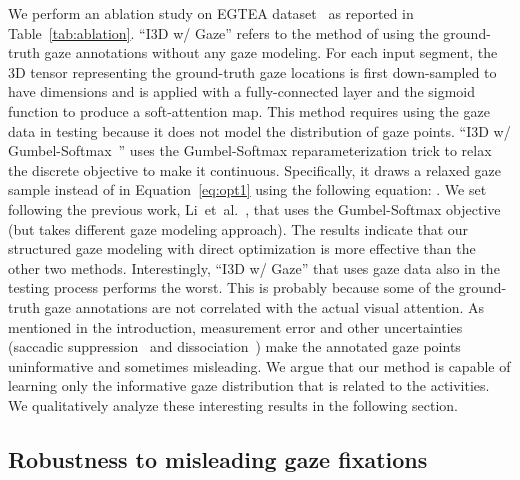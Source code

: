 \documentclass[10pt,twocolumn,letterpaper]{article}
\begin{document}
\label{subsec:ablation}
We perform an ablation study on EGTEA dataset~\cite{li2018eye} as reported in Table~\ref{tab:ablation}. ``I3D w/ Gaze'' refers to the method of using the ground-truth gaze annotations without any gaze modeling. For each input segment, the 3D tensor representing the ground-truth gaze locations  is first down-sampled to have  dimensions and is applied with a fully-connected layer and the sigmoid function to produce a soft-attention map. This method requires using the gaze data in testing because it does not model the distribution of gaze points. ``I3D w/ Gumbel-Softmax~\cite{jang2016categorical,maddison2016concrete}'' uses the Gumbel-Softmax reparameterization trick to relax the discrete objective to make it continuous. Specifically, it draws a relaxed gaze sample  instead of  in Equation~\ref{eq:opt1} using the following equation: . We set  following the previous work, Li~et~al.~\cite{li2018eye}, that uses the Gumbel-Softmax objective (but takes different gaze modeling approach). The results indicate that our structured gaze modeling with direct optimization is more effective than the other two methods. Interestingly, ``I3D w/ Gaze'' that uses gaze data also in the testing process performs the worst. This is probably because some of the ground-truth gaze annotations are not correlated with the actual visual attention. As mentioned in the introduction, measurement error and other uncertainties (saccadic suppression~\cite{krekelberg2010saccadic} and dissociation~\cite{brefczynski1999physiological,juan2004dissociation}) make the annotated gaze points uninformative and sometimes misleading. We argue that our method is capable of learning only the informative gaze distribution that is related to the activities. We qualitatively analyze these interesting results in the following section.

\subsection{Robustness to misleading gaze fixations}
\end{document}
